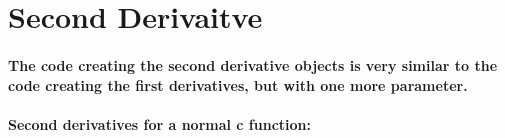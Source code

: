 \documentclass[9pt,onside,a4paper]{article}
\begin{document}
\normalfont
\normalsize

\section{Second Derivaitve}

\paragraph{The code creating the second derivative objects is very similar to the code creating the first derivatives, but with one more parameter.\\}
\paragraph{Second derivatives for a normal c function:\\}
\noindent
\ttfamily
\end{document}
